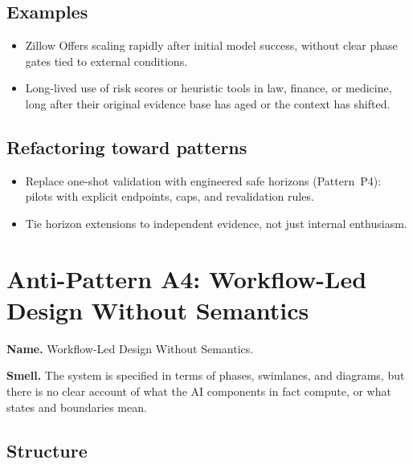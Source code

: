 \subsection*{Examples}

\begin{itemize}
  \item Zillow Offers scaling rapidly after initial model success,
        without clear phase gates tied to external conditions.
  \item Long-lived use of risk scores or heuristic tools in law,
        finance, or medicine, long after their original evidence base
        has aged or the context has shifted.
\end{itemize}

\subsection*{Refactoring toward patterns}

\begin{itemize}
  \item Replace one-shot validation with engineered safe horizons
        (Pattern~P4): pilots with explicit endpoints, caps, and
        revalidation rules.
  \item Tie horizon extensions to independent evidence, not just
        internal enthusiasm.
\end{itemize}

\section{Anti-Pattern A4: Workflow-Led Design Without Semantics}
\label{antipattern:a4}

\textbf{Name.} Workflow-Led Design Without Semantics.

\textbf{Smell.} The system is specified in terms of phases, swimlanes,
and diagrams, but there is no clear account of what the AI components
in fact compute, or what states and boundaries mean.

\subsection*{Structure}

